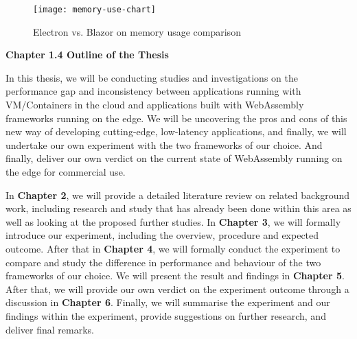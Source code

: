 \bigskip
\begin{figure}[hp]
\centering
\texttt{[image: memory-use-chart]}
\caption{\footnotesize{Electron vs. Blazor on memory usage comparison}}
\captionsetup{aboveskip=0pt,font=it}
\end{figure}
\bigskip

\textbf{{\Large Chapter 1.4 Outline of the Thesis}}
\bigskip

In this thesis, we will be conducting studies and investigations on the performance gap and inconsistency between applications running with VM/Containers in the cloud and applications built with WebAssembly frameworks running on the edge. We will be uncovering the pros and cons of this new way of developing cutting-edge, low-latency applications, and finally, we will undertake our own experiment with the two frameworks of our choice. And finally, deliver our own verdict on the current state of WebAssembly running on the edge for commercial use.

In \textbf{Chapter 2}, we will provide a detailed literature review on related background work, including research and study that has already been done within this area as well as looking at the proposed further studies. In \textbf{Chapter 3}, we will formally introduce our experiment, including the overview, procedure and expected outcome. After that in \textbf{Chapter 4}, we will formally conduct the experiment to compare and study the difference in performance and behaviour of the two frameworks of our choice. We will present the result and findings in \textbf{Chapter 5}. After that, we will provide our own verdict on the experiment outcome through a discussion in \textbf{Chapter 6}. Finally, we will summarise the experiment and our findings within the experiment, provide suggestions on further research, and deliver final remarks.